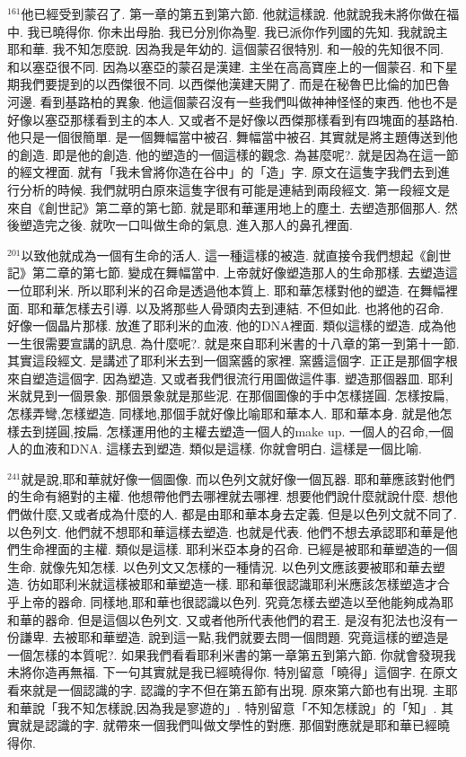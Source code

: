 \documentclass{book}
\begin{document}
$^{161}$他已經受到蒙召了.
第一章的第五到第六節.
他就這樣說.
他就說我未將你做在福中.
我已曉得你.
你未出母胎.
我已分別你為聖.
我已派你作列國的先知.
我就說主耶和華.
我不知怎麼說.
因為我是年幼的.
這個蒙召很特別.
和一般的先知很不同.
和以塞亞很不同.
因為以塞亞的蒙召是漢建.
主坐在高高寶座上的一個蒙召.
和下星期我們要提到的以西傑很不同.
以西傑他漢建天開了.
而是在秘魯巴比倫的加巴魯河邊.
看到基路柏的異象.
他這個蒙召沒有一些我們叫做神神怪怪的東西.
他也不是好像以塞亞那樣看到主的本人.
又或者不是好像以西傑那樣看到有四塊面的基路柏.
他只是一個很簡單.
是一個舞幅當中被召.
舞幅當中被召.
其實就是將主題傳送到他的創造.
即是他的創造.
他的塑造的一個這樣的觀念.
為甚麼呢?.
就是因為在這一節的經文裡面.
就有「我未曾將你造在谷中」的「造」字.
原文在這隻字我們去到進行分析的時候.
我們就明白原來這隻字很有可能是連結到兩段經文.
第一段經文是來自《創世記》第二章的第七節.
就是耶和華運用地上的塵土.
去塑造那個那人.
然後塑造完之後.
就吹一口叫做生命的氣息.
進入那人的鼻孔裡面.

$^{201}$以致他就成為一個有生命的活人.
這一種這樣的被造.
就直接令我們想起《創世記》第二章的第七節.
變成在舞幅當中.
上帝就好像塑造那人的生命那樣.
去塑造這一位耶利米.
所以耶利米的召命是透過他本質上.
耶和華怎樣對他的塑造.
在舞幅裡面.
耶和華怎樣去引導.
以及將那些人骨頭肉去到連結.
不但如此.
也將他的召命.
好像一個晶片那樣.
放進了耶利米的血液.
他的DNA裡面.
類似這樣的塑造.
成為他一生很需要宣講的訊息.
為什麼呢?.
就是來自耶利米書的十八章的第一到第十一節.
其實這段經文.
是講述了耶利米去到一個窯醬的家裡.
窯醬這個字.
正正是那個字根來自塑造這個字.
因為塑造.
又或者我們很流行用圖做這件事.
塑造那個器皿.
耶利米就見到一個景象.
那個景象就是那些泥.
在那個圖像的手中怎樣搓圓.
怎樣按扁,怎樣弄彎,怎樣塑造.
同樣地,那個手就好像比喻耶和華本人.
耶和華本身.
就是他怎樣去到搓圓,按扁.
怎樣運用他的主權去塑造一個人的make up.
一個人的召命,一個人的血液和DNA.
這樣去到塑造.
類似是這樣.
你就會明白.
這樣是一個比喻.

$^{241}$就是說,耶和華就好像一個圖像.
而以色列文就好像一個瓦器.
耶和華應該對他們的生命有絕對的主權.
他想帶他們去哪裡就去哪裡.
想要他們說什麼就說什麼.
想他們做什麼,又或者成為什麼的人.
都是由耶和華本身去定義.
但是以色列文就不同了.
以色列文.
他們就不想耶和華這樣去塑造.
也就是代表.
他們不想去承認耶和華是他們生命裡面的主權.
類似是這樣.
耶利米亞本身的召命.
已經是被耶和華塑造的一個生命.
就像先知怎樣.
以色列文又怎樣的一種情況.
以色列文應該要被耶和華去塑造.
彷如耶利米就這樣被耶和華塑造一樣.
耶和華很認識耶利米應該怎樣塑造才合乎上帝的器命.
同樣地,耶和華也很認識以色列.
究竟怎樣去塑造以至他能夠成為耶和華的器命.
但是這個以色列文.
又或者他所代表他們的君王.
是沒有犯法也沒有一份謙卑.
去被耶和華塑造.
說到這一點,我們就要去問一個問題.
究竟這樣的塑造是一個怎樣的本質呢?.
如果我們看看耶利米書的第一章第五到第六節.
你就會發現我未將你造再無福.
下一句其實就是我已經曉得你.
特別留意「曉得」這個字.
在原文看來就是一個認識的字.
認識的字不但在第五節有出現.
原來第六節也有出現.
主耶和華說「我不知怎樣說,因為我是寥遊的」.
特別留意「不知怎樣說」的「知」.
其實就是認識的字.
就帶來一個我們叫做文學性的對應.
那個對應就是耶和華已經曉得你.
\end{document}
